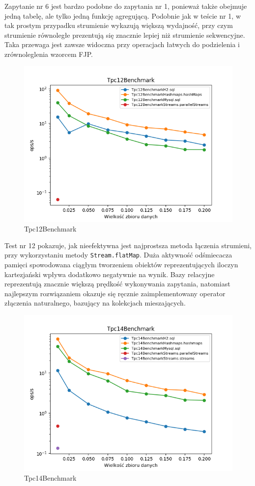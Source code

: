 \documentclass[12pt,twoside,openright]{extarticle}
\begin{document}
    Zapytanie nr 6 jest bardzo podobne do zapytania nr 1, ponieważ także obejmuje jedną tabelę, ale tylko jedną funkcję agregującą. Podobnie jak w teście nr 1, w tak prostym przypadku strumienie wykazują większą wydajność, przy czym strumienie równoległe prezentują się znacznie lepiej niż strumienie sekwencyjne. Taka przewaga jest zawsze widoczna przy operacjach łatwych do podzielenia i zrównoleglenia wzorcem FJP.

\newpage
\begin{figure}[H]
\centering
\includegraphics[width=15cm]{plots/Tpc12Benchmark}
\caption{Tpc12Benchmark}
\end{figure}

    Test nr 12 pokazuje, jak nieefektywna jest najprostsza metoda łączenia strumieni, przy wykorzystaniu metody \texttt{Stream.flatMap}. Duża aktywność odśmiecacza pamięci spowodowana ciągłym tworzeniem obiektów reprezentujących iloczyn kartezjański wpływa dodatkowo negatywnie na wynik. Bazy relacyjne reprezentują znacznie większą prędkość wykonywania zapytania, natomiast najlepszym rozwiązaniem okazuje się ręcznie zaimplementowany operator złączenia naturalnego, bazujący na kolekcjach mieszających.

\newpage
\begin{figure}[H]
\centering
\includegraphics[width=15cm]{plots/Tpc14Benchmark}
\caption{Tpc14Benchmark}
\end{figure}
\end{document}
